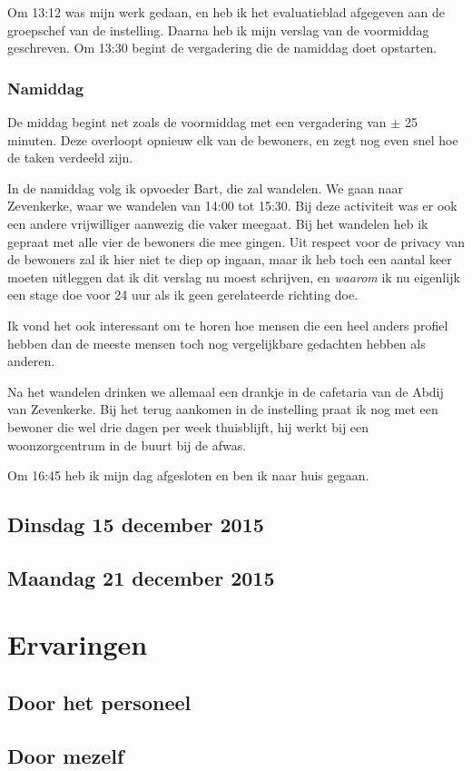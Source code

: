 \documentclass[a4paper,12pt]{article}
\begin{document}
Om 13:12 was mijn werk gedaan, en heb ik het evaluatieblad afgegeven aan de groepschef van de instelling. Daarna heb ik mijn verslag van de voormiddag geschreven. Om 13:30 begint de vergadering die de namiddag doet opstarten.

\subsubsection{Namiddag}

De middag begint net zoals de voormiddag met een vergadering van $\pm$ 25 minuten. Deze overloopt opnieuw elk van de bewoners, en zegt nog even snel hoe de taken verdeeld zijn.

In de namiddag volg ik opvoeder Bart, die zal wandelen. We gaan naar Zevenkerke, waar we wandelen van 14:00 tot 15:30. Bij deze activiteit was er ook een andere vrijwilliger aanwezig die vaker meegaat. Bij het wandelen heb ik gepraat met alle vier de bewoners die mee gingen. Uit respect voor de privacy van de bewoners zal ik hier niet te diep op ingaan, maar ik heb toch een aantal keer moeten uitleggen dat ik dit verslag nu moest schrijven, en \emph{waarom} ik nu eigenlijk een stage doe voor 24 uur als ik geen gerelateerde richting doe.

Ik vond het ook interessant om te horen hoe mensen die een heel anders profiel hebben dan de meeste mensen toch nog vergelijkbare gedachten hebben als anderen.

Na het wandelen drinken we allemaal een drankje in de cafetaria van de Abdij van Zevenkerke. Bij het terug aankomen in de instelling praat ik nog met een bewoner die wel drie dagen per week thuisblijft, hij werkt bij een woonzorgcentrum in de buurt bij de afwas.

Om 16:45 heb ik mijn dag afgesloten en ben ik naar huis gegaan.

\subsection{Dinsdag 15 december 2015}

\subsection{Maandag 21 december 2015}

\section{Ervaringen}

\subsection{Door het personeel}

\subsection{Door mezelf}
\end{document}
